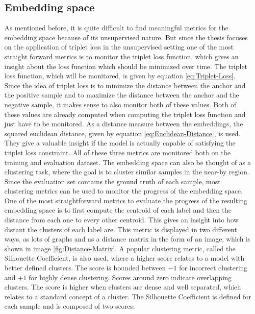 \subsection{Embedding space}
\label{sub:Metrics-Embedding-Space}
As mentioned before, it is quite difficult to find meaningful metrics for the embedding space because of its unsupervised nature. But since the thesis focuses on the application of triplet loss in the unsupervised setting one of the most straight forward metrics is to monitor the triplet loss function, which gives an insight about the loss function which should be minimized over time. The triplet loss function, which will be monitored, is given by equation \ref{eq:Triplet-Loss}. Since the idea of triplet loss is to minimize the distance between the anchor and the positive sample and to maximize the distance between the anchor and the negative sample, it makes sense to also monitor both of these values. Both of these values are already computed when computing the triplet loss function and just have to be monitored. As a distance measure between the embeddings, the squared euclidean distance, given by equation \ref{eq:Euclidean-Distance}, is used. They give a valuable insight if the model is actually capable of satisfying the triplet loss constraint. All of these three metrics are monitored both on the training and evaluation dataset.
\newline
\newline
The embedding space can also be thought of as a clustering task, where the goal is to cluster similar samples in the near-by region. Since the evaluation set contains the ground truth of each sample, most clustering metrics can be used to monitor the progress of the embedding space. 
\newline
\newline
One of the most straightforward metrics to evaluate the progress of the resulting embedding space is to first compute the centroid of each label and then the distance from each one to every other centroid. This gives an insight into how distant the clusters of each label are. This metric is displayed in two different ways, as lots of graphs and as a distance matrix in the form of an image, which is shown in image \ref{fig:Distance-Matrix}.
\newline
\newline
A popular clustering metric, called the Silhouette Coefficient, is also used, where a higher score relates to a model with better defined clusters. The score is bounded between $-1$ for incorrect clustering and $+1$ for highly dense clustering. Scores around zero indicate overlapping clusters. The score is higher when clusters are dense and well separated, which relates to a standard concept of a cluster. The Silhouette Coefficient is defined for each sample and is composed of two scores:
